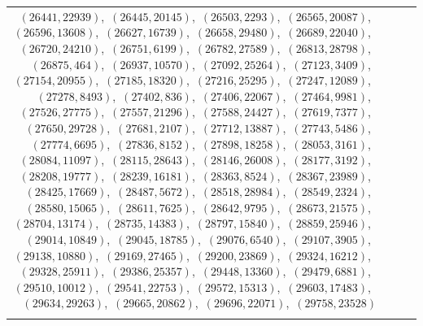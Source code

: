 \documentclass[11pt]{article}
\begin{document}
\begin{longtable}{@{}rrl>{\raggedright\arraybackslash}p{}@{}}
$(26441,22939)$,\allowbreak\ $(26445,20145)$,\allowbreak\ $(26503,2293)$,\allowbreak\ $(26565,20087)$,\allowbreak\ $(26596,13608)$,\allowbreak\ $(26627,16739)$,\allowbreak\ $(26658,29480)$,\allowbreak\ $(26689,22040)$,\allowbreak\ $(26720,24210)$,\allowbreak\ $(26751,6199)$,\allowbreak\ $(26782,27589)$,\allowbreak\ $(26813,28798)$,\allowbreak\ $(26875,464)$,\allowbreak\ $(26937,10570)$,\allowbreak\ $(27092,25264)$,\allowbreak\ $(27123,3409)$,\allowbreak\ $(27154,20955)$,\allowbreak\ $(27185,18320)$,\allowbreak\ $(27216,25295)$,\allowbreak\ $(27247,12089)$,\allowbreak\ $(27278,8493)$,\allowbreak\ $(27402,836)$,\allowbreak\ $(27406,22067)$,\allowbreak\ $(27464,9981)$,\allowbreak\ $(27526,27775)$,\allowbreak\ $(27557,21296)$,\allowbreak\ $(27588,24427)$,\allowbreak\ $(27619,7377)$,\allowbreak\ $(27650,29728)$,\allowbreak\ $(27681,2107)$,\allowbreak\ $(27712,13887)$,\allowbreak\ $(27743,5486)$,\allowbreak\ $(27774,6695)$,\allowbreak\ $(27836,8152)$,\allowbreak\ $(27898,18258)$,\allowbreak\ $(28053,3161)$,\allowbreak\ $(28084,11097)$,\allowbreak\ $(28115,28643)$,\allowbreak\ $(28146,26008)$,\allowbreak\ $(28177,3192)$,\allowbreak\ $(28208,19777)$,\allowbreak\ $(28239,16181)$,\allowbreak\ $(28363,8524)$,\allowbreak\ $(28367,23989)$,\allowbreak\ $(28425,17669)$,\allowbreak\ $(28487,5672)$,\allowbreak\ $(28518,28984)$,\allowbreak\ $(28549,2324)$,\allowbreak\ $(28580,15065)$,\allowbreak\ $(28611,7625)$,\allowbreak\ $(28642,9795)$,\allowbreak\ $(28673,21575)$,\allowbreak\ $(28704,13174)$,\allowbreak\ $(28735,14383)$,\allowbreak\ $(28797,15840)$,\allowbreak\ $(28859,25946)$,\allowbreak\ $(29014,10849)$,\allowbreak\ $(29045,18785)$,\allowbreak\ $(29076,6540)$,\allowbreak\ $(29107,3905)$,\allowbreak\ $(29138,10880)$,\allowbreak\ $(29169,27465)$,\allowbreak\ $(29200,23869)$,\allowbreak\ $(29324,16212)$,\allowbreak\ $(29328,25911)$,\allowbreak\ $(29386,25357)$,\allowbreak\ $(29448,13360)$,\allowbreak\ $(29479,6881)$,\allowbreak\ $(29510,10012)$,\allowbreak\ $(29541,22753)$,\allowbreak\ $(29572,15313)$,\allowbreak\ $(29603,17483)$,\allowbreak\ $(29634,29263)$,\allowbreak\ $(29665,20862)$,\allowbreak\ $(29696,22071)$,\allowbreak\ $(29758,23528)$\\
\addlinespace[3pt]

\end{longtable}
\end{document}
